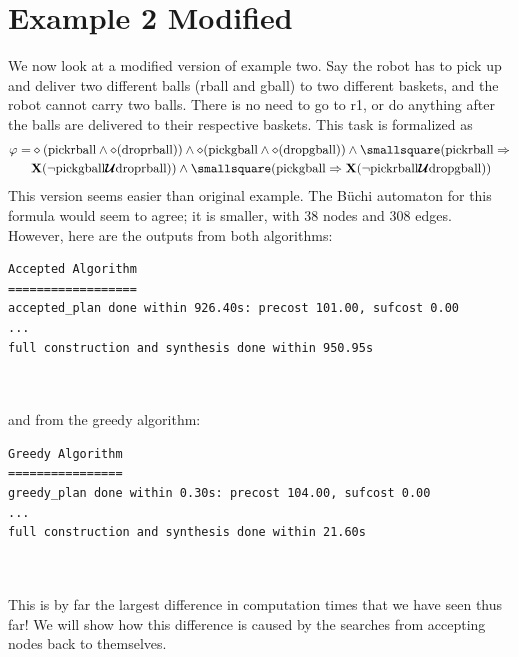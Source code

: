 \section{Example 2 Modified}
We now look at a modified version of example two. Say the robot has to pick up and deliver two different balls (rball and gball) to two different baskets, and the robot cannot carry two balls. There is no need to go to r1, or do anything after the balls are delivered to their respective baskets. This task is formalized as 
\begin{align*}
\small \varphi = & \diamond (\text{pickrball} \wedge \diamond (\text{droprball})) \wedge \diamond(\text{pickgball} \wedge \diamond (\text{dropgball})) \wedge \smallsquare (\text{pickrball} \Rightarrow \\ 
 \small & \textbf{X}(\neg \text{pickgball} \U \text{droprball})) \wedge \smallsquare (\text{pickgball} \Rightarrow \textbf{X} (\neg \text{pickrball} \U \text{dropgball}))
\end{align*}
This version seems easier than original example. The B\"uchi automaton for this formula would seem to agree; it is smaller, with 38 nodes and 308 edges. However, here are the outputs from both algorithms: \\


\begin{minipage}{\textwidth}
\begingroup
\fontsize{9pt}{12pt}\selectfont
\begin{lstlisting}
Accepted Algorithm
==================
accepted_plan done within 926.40s: precost 101.00, sufcost 0.00
...
full construction and synthesis done within 950.95s 
\end{lstlisting}
\endgroup
\end{minipage} \\ \\


and from the greedy algorithm: \\


\begin{minipage}{\textwidth}
\begingroup
\fontsize{9pt}{12pt}\selectfont
\begin{lstlisting}
Greedy Algorithm
================
greedy_plan done within 0.30s: precost 104.00, sufcost 0.00
...
full construction and synthesis done within 21.60s
\end{lstlisting} 
\endgroup
\end{minipage} \\ \\


This is by far the largest difference in computation times that we have seen thus far! We will show how this difference is caused by the searches from accepting nodes back to themselves.

